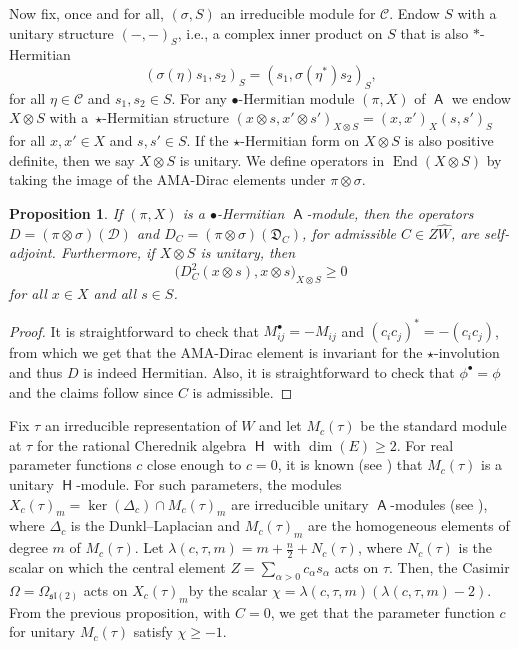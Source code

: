 \documentclass[pdftex]{sigma}
\numberwithin{equation}{section}
\newtheorem{Proposition}[Theorem]{Proposition}
 { \theoremstyle{definition}
\newtheorem{Definition}[Theorem]{Definition}
\newtheorem{Note}[Theorem]{Note}
\newtheorem{Example}[Theorem]{Example}
\newtheorem{Remark}[Theorem]{Remark} }
\DeclareMathOperator{\End}{End}
\newcommand{\fl}{\mathfrak{l}}
\newcommand{\fs}{\mathfrak{s}}
\newcommand{\Cc}{\mathcal{C}}
\DeclareMathOperator{\rca}{\mathsf{H}}
\DeclareMathOperator{\ama}{\mathsf{A}}
\begin{document}
Now fix, once and for all, $(\sigma,S)$ an irreducible module for $\Cc$.
Endow $S$ with a unitary structure $(-,-)_S$, i.e., a complex inner product on $S$ that is also $\ast$-Hermitian
\[
(\sigma(\eta)s_1,s_2)_S = (s_1,\sigma(\eta^*)s_2)_S,
\]
for all $\eta\in\Cc$ and $s_1,s_2\in S$. For any $\bullet$-Hermitian module $(\pi,X)$ of $\ama$ we endow $X\otimes S$ with a~$\star$-Hermitian structure $(x\otimes s,x'\otimes s')_{X\otimes S} = (x,x')_X(s,s')_S$ for all $x,x'\in X$ and $s,s' \in S$. If the $\star$-Hermitian form on $X \otimes S$ is also positive definite, then we say $X \otimes S$ is unitary. We define operators in $\End(X\otimes S)$ by taking the image of the AMA-Dirac elements under $\pi\otimes\sigma$.

\begin{Proposition}
If $(\pi,X)$ is a $\bullet$-Hermitian $\ama$-module, then the operators $D = (\pi\otimes\sigma)(\mathcal{D})$ and $D_C = (\pi\otimes\sigma)(\mathfrak{D}_C)$, for admissible $C\in Z\hat{W}$, are self-adjoint. Furthermore, if $X\otimes S$ is unitary, then
\[
\big(D_C^2(x\otimes s),x\otimes s\big)_{X\otimes S} \geq 0
\]
for all $x \in X$ and all $s \in S$.
\end{Proposition}

\begin{proof}
It is straightforward to check that $M_{ij}^\bullet = -M_{ij}$ and $(c_ic_j)^* = -(c_ic_j)$, from which we get that the AMA-Dirac element is invariant for the $\star$-involution and thus $D$ is indeed Hermitian. Also, it is straightforward to check that $\phi^\bullet = \phi$ and the claims follow since $C$ is admissible.
\end{proof}

\begin{Example}\label{e:harmonicex}
Fix $\tau$ an irreducible representation of $W$ and let $M_c(\tau)$ be the standard module at $\tau$ for the rational Cherednik algebra $\rca$ with $\dim(E) \geq 2$. For real parameter functions $c$ close enough to $c=0$, it is known (see \cite{ES09}) that $M_c(\tau)$ is a unitary $\rca$-module. For such parameters, the modules $X_c(\tau)_m = \ker(\Delta_c)\cap M_c(\tau)_m$ are irreducible unitary $\ama$-modules (see \cite[Theorem~B]{CDM20}), where $\Delta_c$ is the Dunkl--Laplacian and $M_c(\tau)_m$ are the homogeneous elements of degree $m$ of $M_c(\tau)$. Let $\lambda(c,\tau,m)=m + \tfrac{n}{2} + N_c(\tau)$, where $N_c(\tau)$ is the scalar on which the central element $Z = \sum_{\alpha>0} c_\alpha s_\alpha$ acts on $\tau$. Then, the Casimir $\Omega = \Omega_{\fs\fl(2)}$ acts on $X_c(\tau)_m$by the scalar $\chi = \lambda(c,\tau,m)(\lambda(c,\tau,m) - 2)$. From the previous proposition, with $C=0$, we get that the parameter function $c$ for unitary $M_c(\tau)$ satisfy $\chi \geq -1$.
\end{Example}
\end{document}
